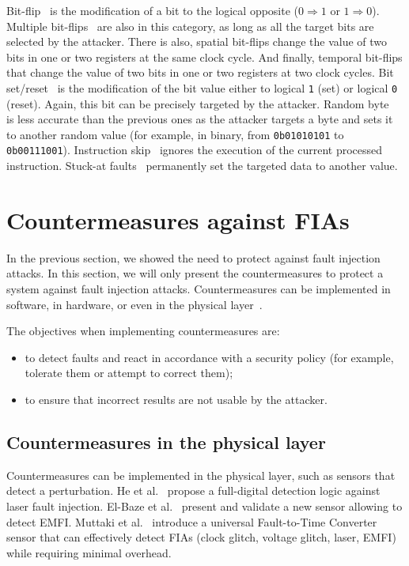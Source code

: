 Bit-flip~\cite{CMDMRD-19-host} is the modification of a bit to the logical opposite ($0 \Rightarrow 1$ or $1 \Rightarrow 0$).
Multiple bit-flips~\cite{CGVCBLC-22-cardis} are also in this category, as long as all the target bits are selected by the attacker.
There is also, spatial bit-flips change the value of two bits in one or two registers at the same clock cycle.
And finally, temporal bit-flips that change the value of two bits in one or two registers at two clock cycles.
Bit set/reset~\cite{BS-03-financialcrypto} is the modification of the bit value either to logical \texttt{1} (set) or logical \texttt{0} (reset). Again, this bit can be precisely targeted by the attacker.
Random byte~\cite{LFZD-16-fdtc} is less accurate than the previous ones as the attacker targets a byte and sets it to another random value (for example, in binary, from \texttt{0b01010101} to \texttt{0b00111001}).
Instruction skip~\cite{MDPRD-20-dtis} ignores the execution of the current processed instruction.
Stuck-at faults~\cite{MABGHMRSYV-18-fdtc} permanently set the targeted data to another value.


\section{Countermeasures against FIAs}
\label{section:countermeasuresAgainstFIA}
In the previous section, we showed the need to protect against fault injection attacks.
In this section, we will only present the countermeasures to protect a system against fault injection attacks.
Countermeasures can be implemented in software, in hardware, or even in the physical layer~\cite{BCNTW-06-procieee}.

The objectives when implementing countermeasures are:
\begin{itemize}
    \item to detect faults and react in accordance with a security policy (for example, tolerate them or attempt to correct them);
    \item to ensure that incorrect results are not usable by the attacker. 
\end{itemize}

\subsection{Countermeasures in the physical layer}
Countermeasures can be implemented in the physical layer, such as sensors that detect a perturbation. He et al.~\cite{HBB-16-space} propose a full-digital detection logic against laser fault injection. El-Baze et al.~\cite{ERM-16-date} present and validate a new sensor allowing to detect EMFI. Muttaki et al.~\cite{MZTF-22-host} introduce a universal Fault-to-Time Converter sensor that can effectively detect FIAs (clock glitch, voltage glitch, laser, EMFI) while requiring minimal overhead.

